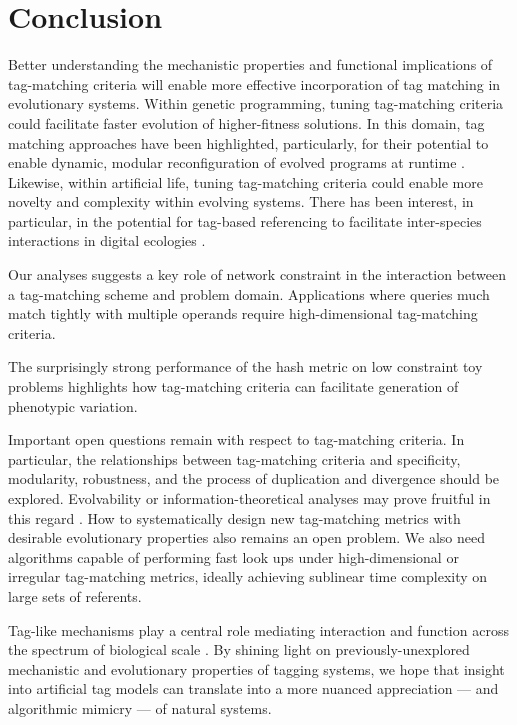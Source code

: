 \section{Conclusion}

Better understanding the mechanistic properties and functional implications of tag-matching criteria will enable more effective incorporation of tag matching in evolutionary systems.
Within genetic programming, tuning tag-matching criteria could facilitate faster evolution of higher-fitness solutions.
In this domain, tag matching approaches have been highlighted, particularly, for their potential to enable dynamic, modular reconfiguration of evolved programs at runtime \citep{spector2011tag,lalejini2021tag}.
Likewise, within artificial life, tuning tag-matching criteria could enable more novelty and complexity within evolving systems.
There has been interest, in particular, in the potential for tag-based referencing to facilitate inter-species interactions in digital ecologies \citep{dolson2021review}.

Our analyses suggests a key role of network constraint in the interaction between a tag-matching scheme and problem domain.
Applications where queries much match tightly with multiple operands require high-dimensional tag-matching criteria.

The surprisingly strong performance of the hash metric on low constraint toy problems highlights how tag-matching criteria can facilitate generation of phenotypic variation.

Important open questions remain with respect to tag-matching criteria.
In particular, the relationships between tag-matching criteria and specificity, modularity, robustness, and the process of duplication and divergence should be explored.
Evolvability or information-theoretical analyses may prove fruitful in this regard \citep{tarapore2015evolvability}.
How to systematically design new tag-matching metrics with desirable evolutionary properties also remains an open problem.
We also need algorithms capable of performing fast look ups under high-dimensional or irregular tag-matching metrics, ideally achieving sublinear time complexity on large sets of referents.

Tag-like mechanisms play a central role mediating interaction and function across the spectrum of biological scale \citep{holland2012signals}.
By shining light on previously-unexplored mechanistic and evolutionary properties of tagging systems, we hope that insight into artificial tag models can translate into a more nuanced appreciation --- and algorithmic mimicry --- of natural systems.
